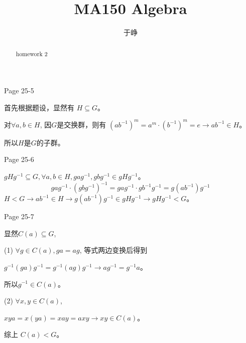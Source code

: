 \documentclass{ximera}
\title{MA150 Algebra }
\author{于峥}
\begin{document}
\begin{abstract}
    homework 2
\end{abstract}
\maketitle

\begin{problem} Page 25-5
    \begin{solution}
        首先根据题设，显然有 $H \subseteq G$。

        对$\forall a, b \in H$, 因$G$是交换群，则有
        $(ab^{-1})^m=a^m\cdot (b^{-1})^m=e\rightarrow ab^{-1}\in H$。

        所以$H$是$G$的子群。
    \end{solution}
\end{problem}

\begin{problem} Page 25-6
    \begin{solution}
        $gHg^{-1} \subseteq G, \forall a, b \in H, gag^{-1}, gbg^{-1} \in gHg^{-1}$。
        \begin{equation}
            gag^{-1}\cdot (gbg^{-1})^{-1}=gag^{-1}\cdot gb^{-1}g^{-1}=g(ab^{-1})g^{-1}
        \end{equation}
        $H < G \rightarrow ab^{-1} \in H \rightarrow g(ab^{-1}) g^{-1} \in gHg^{-1} \rightarrow gHg^{-1} < G$。
    \end{solution}
\end{problem}

\begin{problem} Page 25-7
    \begin{solution}
        显然$C(a) \subseteq G$,

        (1) $\forall g \in C(a), ga = ag$, 等式两边变换后得到
        
        $g^{-1}(ga)g^{-1}=g^{-1}(ag)g^{-1} \rightarrow ag^{-1}=g^{-1}a$。

        所以$g^{-1} \in C(a)$。

        (2) $\forall x, y \in C(a)$,
        
        $xya=x(ya)=xay=axy \rightarrow xy \in C(a)$。

        综上 $C(a) < G$。

    \end{solution}
\end{problem}
\end{document}

